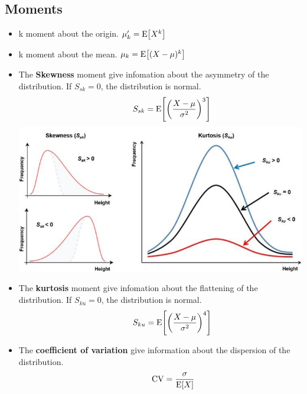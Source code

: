 \documentclass[10pt, french]{article}
\begin{document}
\begin{multicols*}{3}
\section*{Moments}
\begin{itemize}[align=left,leftmargin=*]
    \item k moment about the origin. $\mu_k'=\mathrm{E} {\left[ X^k \right]}$
    \item k moment about the mean. $\mu_k=\mathrm{E} {\left[ (X-\mu)^k \right]}$
    \item The \textbf{Skewness} moment give infomation about the asymmetry of the distribution. If $S_{sk}=0$, the distribution is normal. \[\hspace*{1cm} S_{sk} = \mathrm{E} {\left[ \left(\frac{X-\mu}{\sigma^2}\right)^3 \right]} \] %
    \includegraphics[scale=0.34]{src/Illustration-skewness-and-kurtosis.png}
    \item The \textbf{kurtosis} moment give infomation about the flattening of the distribution. If $S_{ku}=0$, the distribution is normal. \[\hspace*{1cm} S_{ku} = \mathrm{E} {\left[ \left(\frac{X-\mu}{\sigma^2}\right)^4 \right]} \] %
    \item The \textbf{coefficient of variation} give information about the dispersion of the distribution. \[\hspace*{1.1cm} \mathrm{CV} = \frac{\sigma}{\mathrm{E} {\left[ X \right]}} \]
\end{itemize}




\end{multicols*}
\end{document}
